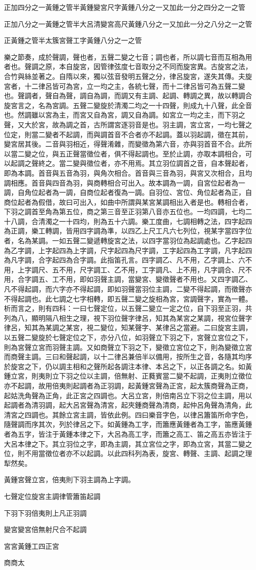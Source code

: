 \begin{pinyinscope}
正加四分之一黃鍾之管半黃鍾變宮尺字黃鍾八分之一又加此一分之四分之一之管

正加八分之一黃鍾之管半大呂清變宮高尺黃鍾八分之一又加此一分之八分之一之管

正黃鍾之管半太簇宮聲工字黃鍾八分之一之管

樂之節奏，成於聲調，聲也者，五聲二變之七音；調也者，所以調七音而互相為用者也。聲調之原，本自旋宮，因管律弦度七音取分之不同而旋宮異。古旋宮之法，合竹與絲並著之。自隋以來，獨以弦音發明五聲之分，律呂旋宮，遂失其傳。夫旋宮者，十二律呂皆可為宮，立一均之主，各統七聲，而十二律呂皆可為五聲二變也。聲調者，聲自為聲，調自為調，而調又有主調、起調、轉調之異，故以轉調合旋宮言之，名為宮調。五聲二變旋於清濁二均之一十四聲，則成九十八聲，此全音也。然調雖以宮為主，而宮又自為宮，調又自為調。如宮立一均之主，而下羽之聲，又大於宮，故為調之首，古所謂宮逐羽音是也。羽主調，宮立宮，一均七聲之位定，則當二變者不起調，而與調首音不合者亦不起調。蓋以羽起調，徵在其前，變宮居其後。二音與羽相近，得聲淆雜，而變徵為第六音，亦與羽首音不合。此所以當二變之位，與五正聲當徵位者，俱不得起調也。至於止調，亦取本調相合，可以起調之聲終之。當二變與徵位者，亦不用焉。其立羽位調首之音，自本聲起者，即為本調。首音與五音為羽，與角次相合。首音與三音為羽，與宮又次相合，且均調相應。首音與四音為羽，與商轉相合可出入。故本調為一調，自宮位起者為一調，自角位起者為一調，自商位起者復為一調。自羽位、宮位、角位起者為正，自商位起者為假借，故曰可出入，如曲中所謂與某宮某調相出入者是也。轉相合者，下羽之調首至角為第五位，商之第三音至正羽第八音亦五位也。一均四調，七均二十八調，合清濁之一十四均，則為五十六調。樂工度曲，七調相轉之法，四字起四為正調，樂工轉調，皆用四字調為準，以四乙上尺工凡六七列位，視某字當四字位者，名為某調。一如五聲二變遞轉旋宮之法，以四字當羽位為起調處也。乙字起四為乙字調，上字起四為上字調，尺字起四為尺字調，工字起四為工字調，凡字起四為凡字調，合字起四為合字調。此指笛孔言。四字調乙、凡不用，乙字調上、六不用，上字調尺、五不用，尺字調工、乙不用，工字調凡、上不用，凡字調合、尺不用，合字調五、工不用，即如羽聲主調，當變宮、變徵聲者不用也。又四字調乙、凡不得起調，而六字亦不得起調，即如羽聲當羽位主調，二變不得起調，而徵聲亦不得起調也。此七調之七字相轉，即五聲二變之旋相為宮，宮調聲字，實為一體。析而言之，則有四科：一曰七聲定位，以五聲二變立一定之位，自下羽至正羽，共列為八，顯明隔八相生之理，視下羽位聲字律呂，知其為某宮之某調，視宮位聲字律呂，知其為某調之某宮，視二變位，知某聲字、某律呂之當避。二曰旋宮主調，以五聲二變旋於七聲定位之下，亦分八位，如羽聲立下羽之下，宮聲立宮位之下，則為宮聲立宮而羽聲主調。又如商聲立下羽之下，變徵立宮位之下，則為變徵立宮而商聲主調。三曰和聲起調，以十二律呂兼倍半以備用，按所生之音，各隨其均序於旋宮之下，仍以調主相和之聲所起各調注本律、本呂之下，以正各調之名。如黃鍾立宮，則夷則立下羽之位以主調，倍無射、正蕤賓當二變不起調，正夷則立徵位亦不起調，故用倍夷則起調者為正羽調，起黃鍾宮聲為正宮，起太簇商聲為正商，起姑洗角聲為正角，此正宮之四調也。大呂立宮，則倍南呂立下羽之位主調，用以起調者為清羽調，起大呂宮聲為清宮，起夾鍾商聲為清商，起仲呂角聲為清角，此清宮之四調也。其餘立宮主調，皆依此例。四曰樂音字色，以律呂簫笛所命字色，隨聲調而序其次，列於律呂之下。如黃鍾為工字，而簫應黃鍾者為工字，笛應黃鍾者為五字，皆注于黃鍾本律之下，大呂為高工字，而簫之高工、笛之高五亦皆注于大呂本律之下。其立羽位之字，即為主調，其立宮位之字，即為立宮，其當二變之位，則不用當徵位者亦不以起調。以此四科列為表，旋宮、轉聲、主調、起調之理犁然矣。

黃鍾宮聲立宮，倍夷則下羽主調為上字調。

七聲定位旋宮主調律管簫笛起調

下羽下羽倍夷則上凡正羽調

變宮變宮倍無射尺合不起調

宮宮黃鍾工四正宮

商商太
\end{pinyinscope}
